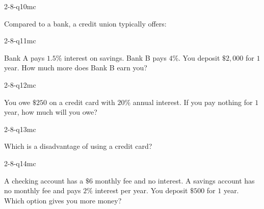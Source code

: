 \begin{practiceQuestion}{2-8-q10}{mc}
\begin{questionText}
Compared to a bank, a credit union typically offers:
\end{questionText}
\end{practiceQuestion}

\begin{practiceQuestion}{2-8-q11}{mc}
\begin{questionText}
Bank A pays $1.5\%$ interest on savings. Bank B pays $4\%$. You deposit $\$2{,}000$ for $1$ year. How much more does Bank B earn you?
\end{questionText}
\end{practiceQuestion}

\begin{practiceQuestion}{2-8-q12}{mc}
\begin{questionText}
You owe $\$250$ on a credit card with $20\%$ annual interest. If you pay nothing for $1$ year, how much will you owe?
\end{questionText}
\end{practiceQuestion}

\begin{practiceQuestion}{2-8-q13}{mc}
\begin{questionText}
Which is a disadvantage of using a credit card?
\end{questionText}
\end{practiceQuestion}

\begin{practiceQuestion}{2-8-q14}{mc}
\begin{questionText}
A checking account has a $\$6$ monthly fee and no interest. A savings account has no monthly fee and pays $2\%$ interest per year. You deposit $\$500$ for $1$ year. Which option gives you more money?
\end{questionText}
\end{practiceQuestion}


